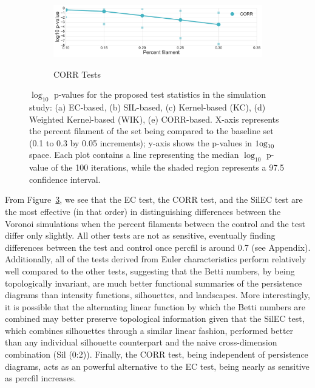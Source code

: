 \documentclass[12pt]{article}
\newcommand{\figref}[1]{Figure~\ref{#1}}
\begin{document}
\begin{center}
\begin{figure}[htp!]
\begin{subfigure}{.5\textwidth}
      \label{fig:sub_weight}
    \end{subfigure}
    \begin{subfigure}{.5\textwidth}
      \caption{CORR Tests}
      \includegraphics[width=\linewidth]{figure_8_correlation_group.pdf}
      \label{fig:sub_corr}
    \end{subfigure}
  \caption{$\log_{10}$ p-values for the proposed test statistics in the simulation study: (a) EC-based, (b) SIL-based, (c) Kernel-based (KC), (d) Weighted Kernel-based (WIK), (e) CORR-based. X-axis represents the percent filament of the set being compared to the baseline set (0.1 to 0.3 by 0.05 increments); y-axis shows the p-values in $\textup{1og}_{10}$ space. Each plot contains a line representing the median $\log_{10}$ p-value of the 100 iterations, while the shaded region represents a 97.5 confidence interval.}
  \label{fig:sub_unstandardized_results}
  \end{figure}
\end{center}

From \figref{fig:sub_unstandardized_results}, we see  that the EC test, the CORR test, and the SilEC test are the most effective (in that order) in distinguishing differences between the Voronoi simulations when the percent filaments between the control and the test differ only slightly. All other tests are not as sensitive, eventually finding differences between the test and control once percfil is around 0.7 (see Appendix). Additionally, all of the tests derived from Euler characteristics perform relatively well compared to the other tests, suggesting that the Betti numbers, by being topologically invariant, are much better functional summaries of the persistence diagrams than intensity functions, silhouettes, and landscapes. More interestingly, it is possible that the alternating linear function by which the Betti numbers are combined may better preserve topological information given that the SilEC test, which combines silhouettes through a similar linear fashion, performed better than any individual silhouette counterpart and the naive cross-dimension combination (Sil (0:2)). Finally, the CORR test, being independent of persistence diagrams, acts as an powerful alternative to the EC test, being nearly as sensitive as percfil increases.
\end{document}
